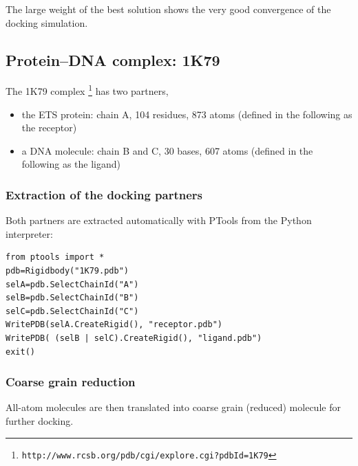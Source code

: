 \documentclass[12pt,a4paper]{article}
\begin{document}
The large weight of the best solution shows the very good convergence of the
docking simulation.

\subsection{Protein--DNA complex: 1K79}

The 1K79 complex \footnote{\tt http://www.rcsb.org/pdb/cgi/explore.cgi?pdbId=1K79} 
has two partners,
\begin{itemize}
\item the ETS protein: chain A, 104 residues, 873 atoms (defined in the following as the receptor)
\item a DNA molecule: chain B and C, 30 bases, 607 atoms (defined in the following as the ligand)
\end{itemize}

\subsubsection{Extraction of the docking partners}

Both partners are extracted automatically with PTools from the Python interpreter:
\begin{verbatim}
from ptools import *
pdb=Rigidbody("1K79.pdb")
selA=pdb.SelectChainId("A")
selB=pdb.SelectChainId("B")
selC=pdb.SelectChainId("C")
WritePDB(selA.CreateRigid(), "receptor.pdb")
WritePDB( (selB | selC).CreateRigid(), "ligand.pdb")
exit()
\end{verbatim}

\subsubsection{Coarse grain reduction}

All-atom molecules are then translated into coarse grain (reduced) molecule for further docking. 
\end{document}
